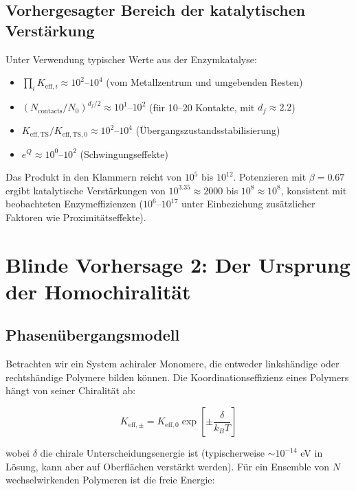 \documentclass[12pt,a4paper]{article}
\newcommand{\df}{d_{\!f}}
\begin{document}
	\subsection{Vorhergesagter Bereich der katalytischen Verstärkung}
	
	Unter Verwendung typischer Werte aus der Enzymkatalyse:
	\begin{itemize}
		\item $\prod_i K_{\mathrm{eff},i} \approx 10^2$--$10^4$ (vom Metallzentrum und umgebenden Resten)
		\item $(N_{\text{contacts}}/N_0)^{\df/2} \approx 10^1$--$10^2$ (für 10--20 Kontakte, mit $\df \approx 2.2$)
		\item $K_{\mathrm{eff},\text{TS}}/K_{\mathrm{eff},\text{TS},0} \approx 10^2$--$10^4$ (Übergangszustandsstabilisierung)
		\item $e^{Q} \approx 10^0$--$10^2$ (Schwingungseffekte)
	\end{itemize}
	
	Das Produkt in den Klammern reicht von $10^5$ bis $10^{12}$. Potenzieren mit $\beta = 0.67$ ergibt katalytische Verstärkungen von $10^{3.35} \approx 2000$ bis $10^{8} \approx 10^8$, konsistent mit beobachteten Enzymeffizienzen ($10^6$--$10^{17}$ unter Einbeziehung zusätzlicher Faktoren wie Proximitätseffekte).
	
	\section{Blinde Vorhersage 2: Der Ursprung der Homochiralität}
	\label{sec:chirality}
	
	\subsection{Phasenübergangsmodell}
	
	Betrachten wir ein System achiraler Monomere, die entweder linkshändige oder rechtshändige Polymere bilden können. Die Koordinationseffizienz eines Polymers hängt von seiner Chiralität ab:
	
	\begin{equation}
		K_{\mathrm{eff},\pm} = K_{\mathrm{eff},0} \exp\left[\pm \frac{\delta}{k_B T}\right]
		\label{eq:keff-chiral}
	\end{equation}
	
	wobei $\delta$ die chirale Unterscheidungsenergie ist (typischerweise $\sim 10^{-14}$ eV in Lösung, kann aber auf Oberflächen verstärkt werden). Für ein Ensemble von $N$ wechselwirkenden Polymeren ist die freie Energie:
	
\end{document}

